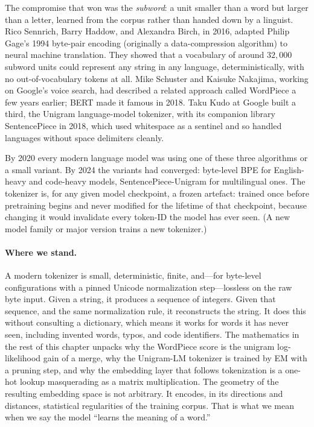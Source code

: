 The compromise that won was the \emph{subword}: a unit smaller than
a word but larger than a letter, learned from the corpus rather
than handed down by a linguist. Rico Sennrich, Barry Haddow, and
Alexandra Birch, in 2016, adapted Philip Gage's 1994 byte-pair
encoding (originally a data-compression algorithm) to neural
machine translation. They showed that a vocabulary of around
$32{,}000$ subword units could represent any string in any
language, deterministically, with no out-of-vocabulary tokens at
all. Mike Schuster and Kaisuke Nakajima, working on Google's
voice search, had described a related approach called WordPiece a
few years earlier; BERT made it famous in 2018. Taku Kudo at
Google built a third, the Unigram language-model tokenizer, with
its companion library SentencePiece in 2018, which used
whitespace as a sentinel and so handled languages without space
delimiters cleanly.

By 2020 every modern language model was using one of these three
algorithms or a small variant. By 2024 the variants had
converged: byte-level BPE for English-heavy and code-heavy
models, SentencePiece-Unigram for multilingual ones. The
tokenizer is, for any given model checkpoint, a frozen artefact:
trained once before pretraining begins and never modified for the
lifetime of that checkpoint, because changing it would invalidate
every token-ID the model has ever seen. (A new model family or
major version trains a new tokenizer.)

\paragraph{Where we stand.} A modern tokenizer is small,
deterministic, finite, and---for byte-level configurations with a
pinned Unicode normalization step---lossless on the raw byte
input. Given a string, it produces a sequence of integers. Given
that sequence, and the same normalization rule, it reconstructs
the string. It does this without consulting a dictionary, which means
it works for words it has never seen, including invented words,
typos, and code identifiers. The mathematics in the rest of this
chapter unpacks why the WordPiece score is the unigram
log-likelihood gain of a merge, why the Unigram-LM tokenizer is
trained by EM with a pruning step, and why the embedding layer
that follows tokenization is a one-hot lookup masquerading as a
matrix multiplication. The geometry of the resulting embedding
space is not arbitrary. It encodes, in its directions and
distances, statistical regularities of the training corpus. That
is what we mean when we say the model ``learns the meaning of a
word.''

